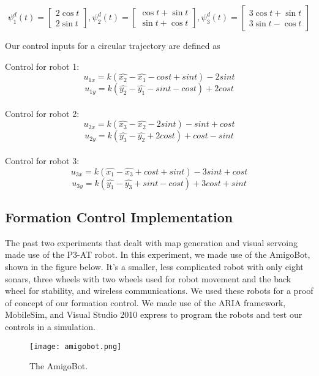 \documentclass[12pt]{article}
\begin{document}
\[	\psi_1^d(t) = \left[\begin{matrix} 2\cos t \\ 2\sin t \end{matrix}\right], 
\psi_2^d(t) =	  \left[\begin{matrix} \cos t + \sin t \\ \sin t + \cos t \end{matrix}\right], 
\psi_3^d(t) =	  \left[\begin{matrix} 3\cos t + \sin t \\ 3\sin t - \cos t \end{matrix}\right]	 \]

Our control inputs for a circular trajectory are defined as

Control for robot 1:
\[ u_{1x} = k(\hat{x_2} - \hat{x_1} - cos t + sin t ) - 2 sin t \] 
\[ u_{1y} = k(\hat{y_2} - \hat{y_1} - sin t - cos t ) + 2 cos t \] \\ 
Control for robot 2:
\[ u_{2x} = k(\hat{x_3} - \hat{x_2} - 2 sin t ) - sin t + cos t \] 
\[ u_{2y} = k(\hat{y_3} - \hat{y_2} + 2 cos t ) + cos t - sin t \] \\ 
Control for robot 3:
\[ u_{3x} = k(\hat{x_1} - \hat{x_3} + cos t + sin t ) - 3 sin t + cos t \] 
\[ u_{3y} = k(\hat{y_1} - \hat{y_3} + sin t - cos t ) + 3 cos t + sin t \] 
 

 

\subsection{Formation Control Implementation} \label{sec:form_control}
The past two experiments that dealt with map generation and visual servoing made use of the P3-AT robot. In this experiment, we made use of the AmigoBot, shown in the figure below. It's a smaller, less complicated robot with only eight sonars, three wheels with two wheels used for robot movement and the back wheel for stability, and wireless communications. We used these robots for a proof of concept of our formation control. We made use of the ARIA framework, MobileSim, and Visual Studio 2010 express to program the robots and test our controls in a simulation.

\begin{figure}[htp!]
	\begin{center}
		\texttt{[image: amigobot.png]}
		\caption{The AmigoBot.} \label{fig.circle}
	\end{center}
\end{figure}
\end{document}
